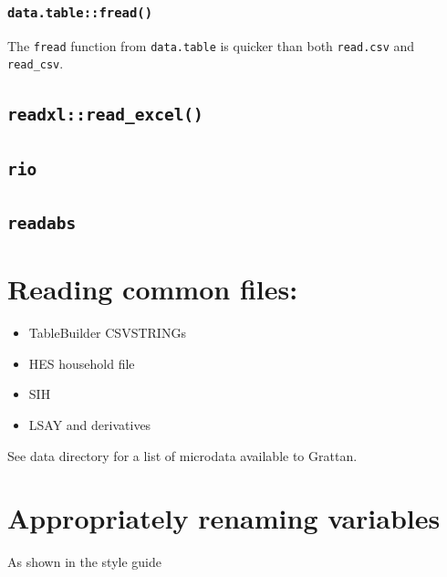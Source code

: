 \documentclass[]{book}
\providecommand{\tightlist}{%
  \setlength{\itemsep}{0pt}\setlength{\parskip}{0pt}}
\begin{document}
\hypertarget{data.tablefread}{%
\subsubsection{\texorpdfstring{\texttt{data.table::fread()}}{data.table::fread()}}\label{data.tablefread}}

The \texttt{fread} function from \texttt{data.table} is quicker than both \texttt{read.csv} and \texttt{read\_csv}.

\hypertarget{readxlread_excel}{%
\subsection{\texorpdfstring{\texttt{readxl::read\_excel()}}{readxl::read\_excel()}}\label{readxlread_excel}}

\hypertarget{rio}{%
\subsection{\texorpdfstring{\texttt{rio}}{rio}}\label{rio}}

\hypertarget{readabs}{%
\subsection{\texorpdfstring{\texttt{readabs}}{readabs}}\label{readabs}}

\hypertarget{reading-common-files}{%
\section{Reading common files:}\label{reading-common-files}}

\begin{itemize}
\tightlist
\item
  TableBuilder CSVSTRINGs
\item
  HES household file
\item
  SIH
\item
  LSAY and derivatives
\end{itemize}

See data directory for a list of microdata available to Grattan.

\hypertarget{appropriately-renaming-variables}{%
\section{Appropriately renaming variables}\label{appropriately-renaming-variables}}

As shown in the style guide
\end{document}
